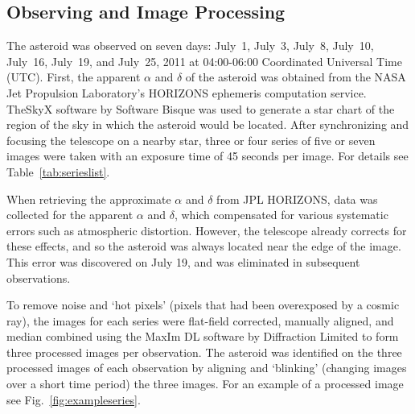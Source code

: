 \documentclass[12pt,journal,compsoc]{IEEEtran}
\begin{document}
\subsection{Observing and Image Processing}
The asteroid was observed on seven days: July~1, July~3, July~8, July~10, July~16, July~19, and July~25, 2011 
at 04:00-06:00 Coordinated Universal Time (UTC).
First, the apparent $\alpha$ and $\delta$ of the asteroid was obtained from the
NASA Jet Propulsion Laboratory's HORIZONS ephemeris computation service.
TheSkyX software by Software Bisque was used to generate a star chart of the region of the sky 
in which the asteroid would be located.
After synchronizing and focusing the telescope on a nearby star, 
three or four series of five or seven images were taken 
with an exposure time of 45 seconds per image. For details see Table~\ref{tab:serieslist}.

When retrieving the approximate $\alpha$ and $\delta$ from JPL HORIZONS, 
data was collected for the apparent $\alpha$ and $\delta$,
which compensated for various systematic errors such as atmospheric distortion.
However, the telescope already corrects for these effects, 
and so the asteroid was always located near the edge of the image. 
This error was discovered on July 19, and was eliminated in subsequent observations.

To remove noise and `hot pixels' (pixels that had been overexposed by a cosmic ray), 
the images for each series were flat-field corrected, manually aligned, and median combined 
using the MaxIm DL software by Diffraction Limited to form three processed images per observation.
The asteroid was identified on the three processed images of each observation 
by aligning and `blinking' (changing images over a short time period) the three images.
For an example of a processed image see Fig.~\ref{fig:exampleseries}.
\end{document}
